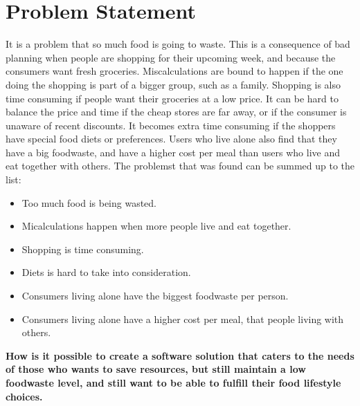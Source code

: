 \chapter{Problem Statement}
It is a problem that so much food is going to waste. This is a consequence of bad planning when people are shopping for their upcoming week, and because the consumers want fresh groceries. Miscalculations are bound to happen if the one doing the shopping is part of a bigger group, such as a family. Shopping is also time consuming if people want their groceries at a low price. It can be hard to balance the price and time if the cheap stores are far away, or if the consumer is unaware of recent discounts. It becomes extra time consuming if the shoppers have special food diets or preferences. Users who live alone also find that they have a big foodwaste, and have a higher cost per meal than users who live and eat together with others. The problemst that was found can be summed up to the list:

\begin{itemize}
    \item Too much food is being wasted.
    \item Micalculations happen when more people live and eat together.
    \item Shopping is time consuming.
    \item Diets is hard to take into consideration.
    \item Consumers living alone have the biggest foodwaste per person.
    \item Consumers living alone have a higher cost per meal, that people living with others.
\end{itemize}

\textbf{How is it possible to create a software solution that caters to the needs of those who wants to save resources, but still maintain a low foodwaste level, and still want to be able to fulfill their food lifestyle choices.}

